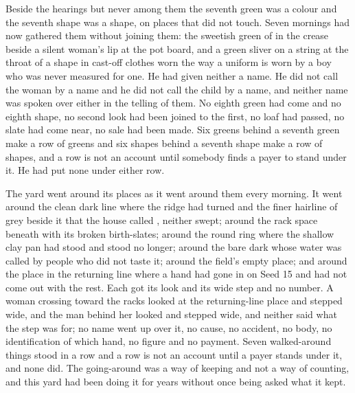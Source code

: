 Beside the hearings but never among them the seventh green was a colour and the seventh shape was a shape, on places that did not touch. Seven mornings had now gathered them without joining them: the sweetish green of  in the crease beside a silent woman's lip at the pot board, and a green sliver on a string at the throat of a shape in cast-off clothes worn the way a uniform is worn by a boy who was never measured for one. He had given neither a name. He did not call the woman by a name and he did not call the child by a name, and neither name was spoken over either in the telling of them. No eighth green had come and no eighth shape, no second look had been joined to the first, no loaf had passed, no slate had come near, no sale had been made. Six greens behind a seventh green make a row of greens and six shapes behind a seventh shape make a row of shapes, and a row is not an account until somebody finds a payer to stand under it. He had put none under either row.

\scenebreak

The yard went around its places as it went around them every morning. It went around the clean dark line where the  ridge had turned and the finer hairline of grey beside it that the house called , neither swept; around the rack space beneath  with its broken birth-slates; around the round ring where the shallow clay pan had stood and stood no longer; around the bare dark  whose water was called  by people who did not taste it; around the field's empty place; and around the place in the returning line where a hand had gone in on Seed 15 and had not come out with the rest. Each got its look and its wide step and no number. A woman crossing toward the racks looked at the returning-line place and stepped wide, and the man behind her looked and stepped wide, and neither said what the step was for; no name went up over it, no cause, no accident, no body, no identification of which hand, no figure and no payment. Seven walked-around things stood in a row and a row is not an account until a payer stands under it, and none did. The going-around was a way of keeping and not a way of counting, and this yard had been doing it for years without once being asked what it kept.

\scenebreak

